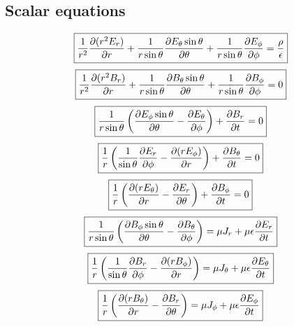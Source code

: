 \documentclass[11pt, a4paper]{article}
\begin{document}
\subsection*{Scalar equations}
\begin{equation}
    \boxed{\frac{1}{r^2}\pdv{(r^2 E_r)}{r}+\frac{1}{r \sin \theta}\pdv{E_\theta \sin \theta}{\theta}+\frac{1}{r \sin \theta}\pdv{E_\phi}{\phi}=\frac{\rho}{\epsilon }}
\end{equation}
\begin{equation}
    \boxed{\frac{1}{r^2}\pdv{(r^2 B_r)}{r}+\frac{1}{r \sin \theta}\pdv{B_\theta \sin \theta}{\theta}+\frac{1}{r \sin \theta}\pdv{B_\phi}{\phi}=0}
\end{equation}
\begin{equation}
    \boxed{ \frac{1}{r \sin \theta}\left(\pdv{E_\phi \sin \theta}{\theta}-\pdv{E_\theta}{\phi}\right)+\pdv{B_r}{t}=0}
\end{equation}
\begin{equation}
    \boxed{\frac{1}{r}\left(\frac{1}{\sin \theta}\pdv{E_r}{\phi}-\pdv{(rE_\phi)}{r}\right)+\pdv{B_\theta}{t}=0}
\end{equation}
\begin{equation}
    \boxed{\frac{1}{r}\left(\pdv{(rE_\theta)}{r}-\pdv{E_r}{\theta}\right)+\pdv{B_\phi}{t}=0}
\end{equation}
\begin{equation}
    \boxed{\frac{1}{r \sin \theta}\left(\pdv{B_\phi \sin \theta}{\theta}-\pdv{B_\theta}{\phi}\right)= \mu J_r + \mu \epsilon \pdv{E_r}{t}}
\end{equation}
\begin{equation}
    \boxed{\frac{1}{r}\left(\frac{1}{\sin \theta}\pdv{B_r}{\phi}-\pdv{(rB_\phi)}{r}\right)=\mu J_\theta + \mu \epsilon \pdv{E_\theta}{t}}
\end{equation}
\begin{equation}
    \boxed{\frac{1}{r}\left(\pdv{(rB_\theta)}{r}-\pdv{B_r}{\theta}\right) = \mu J_\phi + \mu \epsilon \pdv{E_\phi}{t}}
\end{equation}
\end{document}

